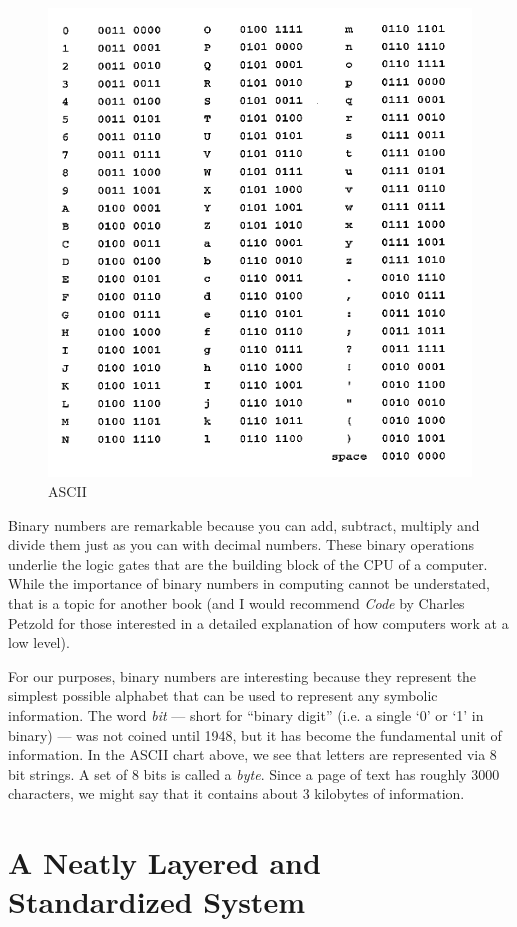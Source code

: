 \documentclass[UTF8]{book}
\begin{document}
\begin{CJK}{UTF8}{gbsn}
\begin{figure}[H]
\centering
\includegraphics[width=0.8\linewidth]{ascii-binary-chart}
\caption{ASCII}
\end{figure}

Binary numbers are remarkable because you can add, subtract, multiply and divide them just as you can with decimal numbers. These binary operations underlie the logic gates that are the building block of the CPU of a computer. While the importance of binary numbers in computing cannot be understated, that is a topic for another book (and I would recommend \emph{Code} by Charles Petzold for those interested in a detailed explanation of how computers work at a low level).

For our purposes, binary numbers are interesting because they represent the simplest possible alphabet that can be used to represent any symbolic information. The word \emph{bit} --- short for ``binary digit'' (i.e. a single `0' or `1' in binary) --- was not coined until 1948, but it has become the fundamental unit of information. In the ASCII chart above, we see that letters are represented via 8 bit strings. A set of 8 bits is called a \emph{byte}. Since a page of text has roughly 3000 characters, we might say that it contains about 3 kilobytes of information.

\section{A Neatly Layered and Standardized System}


\end{CJK}
\end{document}
